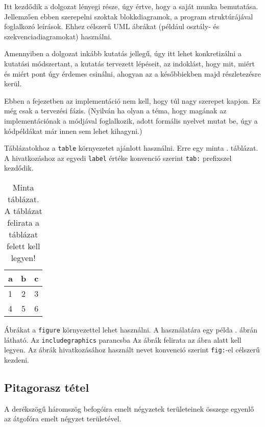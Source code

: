 
Itt kezdődik a dolgozat lényegi része, úgy értve, hogy a saját munka bemutatása.
Jellemzően ebben szerepelni szoktak blokkdiagramok, a program struktúrájával foglalkozó leírások.
Ehhez célszerű UML ábrákat (például osztály- és szekvenciadiagramokat) használni.

Amennyiben a dolgozat inkább kutatás jellegű, úgy itt lehet konkretizálni a kutatási módszertant, a kutatás tervezett lépéseit, az indoklást, hogy mit, miért és miért pont úgy érdemes csinálni, ahogyan az a későbbiekben majd részletezésre kerül.

Ebben a fejezetben az implementáció nem kell, hogy túl nagy szerepet kapjon.
Ez még csak a tervezési fázis.
(Nyilván ha olyan a téma, hogy magának az implementációnak a módjával foglalkozik, adott formális nyelvet mutat be, úgy a kódpéldákat már innen sem lehet kihagyni.)


Táblázatokhoz a \texttt{table} környezetet ajánlott használni.
Erre egy minta . táblázat.
A hivatkozáshoz az egyedi \texttt{label} értéke konvenció szerint \texttt{tab:} prefixszel kezdődik.

\begin{table}[h]
\centering
\caption{Minta táblázat. A táblázat felirata a táblázat felett kell legyen!}
\label{tab:minta}
\begin{tabular}{l|c|c|}
a & b & c \\
\hline
1 & 2 & 3 \\
4 & 5 & 6 \\
\hline
\end{tabular}
\end{table}


Ábrákat a \texttt{figure} környezettel lehet használni.
A használatára egy példa . ábrán látható.
Az \texttt{includegraphics} parancsba 
Az ábrák felirata az ábra alatt kell legyen.
Az ábrák hivatkozásához használt nevet konvenció szerint \texttt{fig:}-el célszerű kezdeni.


\subsection{
Pitagorasz tétel
}

A derékszögű háromszög befogóira emelt négyzetek területeinek összege egyenlő az átgofóra emelt négyzet területével.

